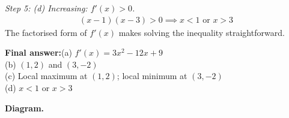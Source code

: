 \documentclass[11pt]{article}
\begin{document}
\textit{Step 5: (d) Increasing: \( f'(x) > 0 \).}
\[\begin{gathered}
(x-1)(x-3) > 0 \implies x < 1 \text{ or } x > 3
\end{gathered}\]
The factorised form of \( f'(x) \) makes solving the inequality straightforward.

\begin{answerbox}
\textbf{Final answer:}\quad (a) \(\displaystyle  f'(x) = 3x^2-12x+9 \) \\[3pt]  (b) \(\displaystyle  (1, 2) \) and \(\displaystyle  (3, -2) \) \\[3pt]  (c) Local maximum at \(\displaystyle  (1, 2) \); local minimum at \(\displaystyle  (3, -2) \) \\[3pt]  (d) \(\displaystyle  x < 1 \) or \(\displaystyle  x > 3 \)
\end{answerbox}
\textbf{Diagram.}
\end{document}
